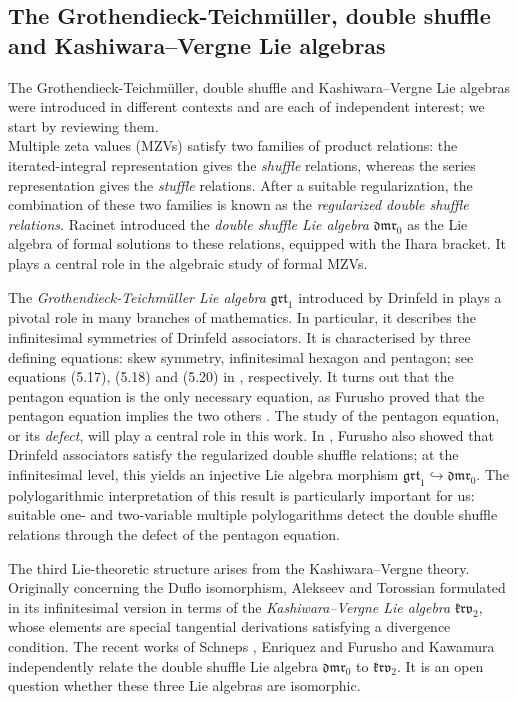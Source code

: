 \documentclass[a4paper,fleqn]{cas-sc}
\newcommand{\grt}{\mathfrak{grt}}
\newcommand{\dmr}{\mathfrak{dmr}}
\newcommand{\krv}{\mathfrak{krv}}
\begin{document}
\subsection{The Grothendieck-Teichm\"uller, double shuffle and Kashiwara--Vergne Lie algebras}
\label{subsec:three_Lie_algebra}

The Grothendieck-Teichmüller, double shuffle and Kashiwara--Vergne Lie algebras were introduced in different contexts and are each of independent interest; we start by reviewing them. \\
Multiple zeta values (MZVs) satisfy two families of product relations: the
iterated-integral representation gives the \textit{shuffle} relations, whereas
the series representation gives the \textit{stuffle} %
relations. After a suitable regularization, the combination of these
two families is known as the \emph{regularized double shuffle
relations}. Racinet \cite{Racinet2002} introduced the \textit{double shuffle Lie algebra} $\mathfrak{dmr}_0$
as the Lie algebra of formal solutions to these relations, equipped with
the Ihara bracket. It plays a central role in the algebraic study of formal MZVs.

The \textit{Grothendieck-Teichmüller Lie algebra} $\mathfrak{grt}_1$ introduced by Drinfeld in \cite{Drinfeld1991} plays a pivotal role in many branches of mathematics. In particular, it describes the infinitesimal symmetries of Drinfeld associators. It is characterised by three defining equations: skew symmetry, infinitesimal hexagon and pentagon; see equations (5.17), (5.18) and (5.20) in \cite{Drinfeld1991}, respectively. It turns out that the pentagon equation is the only necessary equation, as Furusho proved that the pentagon equation implies the two others \cite{furusho_pentagon_2010}. The study of the pentagon equation, or its \textit{defect}, will play a central role in this work. In \cite{Furusho2011}, Furusho also showed that Drinfeld associators satisfy the regularized double shuffle relations; at the infinitesimal level, this yields an injective Lie algebra morphism $\grt_1 \hookrightarrow \dmr_0$. The polylogarithmic interpretation of this result is particularly important for us: suitable one- and two-variable multiple polylogarithms detect the double shuffle relations through the defect of the pentagon equation.

The third Lie-theoretic structure arises from the Kashiwara--Vergne theory. Originally concerning the Duflo isomorphism, Alekseev and Torossian formulated in \cite{Alekseev2012} its infinitesimal version in terms of the \textit{Kashiwara--Vergne Lie algebra} $\mathfrak{krv}_2$,
whose elements are special tangential derivations satisfying a divergence condition. The recent works of Schneps \cite{Schneps2025}, Enriquez and Furusho \cite{EF4} and Kawamura \cite{kawamura2025} independently relate the double shuffle Lie algebra $\dmr_0$ to $\krv_2$. 
It is an open question whether these three Lie algebras are isomorphic.
\end{document}
